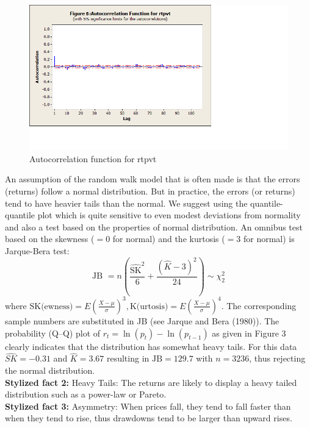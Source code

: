 	\begin{figure}[!ht]
	\centering
	\includegraphics[width=\textwidth]{chapters/chapter_uvts/figures/Sec2-4Fig5.png}
	\caption{Autocorrelation function for rtpvt \label{fig:autocorrtpvt}}
	\end{figure}
An assumption of the random walk model that is often made is that the errors (returns)
follow a normal distribution. But in practice, the errors (or returns) tend to have heavier tails than the normal. We suggest using the quantile-quantile plot which is quite sensitive to even modest deviations from normality and also a test based on the properties of normal distribution. An omnibus test based on the skewness ($=0$ for normal) and the kurtosis ($=3$ for normal) is Jarque-Bera test:
	\begin{equation}\label{eqn:2JB}
	\text{JB }= n\left(\frac{\widehat{\text{SK}}^2}{6} + \frac{(\hat{K} - 3)^2}{24}\right) \sim \chi_2^2
	\end{equation}
where $\text{SK}\text{(ewness)}= E(\frac{X-\mu}{\sigma})^3, \text{K}\text{(urtosis)} = E(\frac{X-\mu}{\sigma})^4$. The corresponding sample numbers are substituted in JB (see Jarque and Bera (1980)\cite{jarque80}). The probability (Q--Q) plot of $r_t = \ln{(p_t)} - \ln{(p_{t-1})}$ as given in Figure 3 clearly indicates that the distribution has somewhat heavy tails. For this data $\widehat{SK} = -0.31$ and $\hat{K} = 3.67$ resulting in $\text{JB}= 129.7$ with $n= 3236$, thus rejecting the normal distribution. \\


\noindent\textbf{Stylized fact 2:} Heavy Tails: The returns are likely to display a heavy
tailed distribution such as a power-law or Pareto. \\


\noindent\textbf{Stylized fact 3:} Asymmetry: When prices fall, they tend to fall faster
than when they tend to rise, thus drawdowns tend to be larger than upward rises. \\


